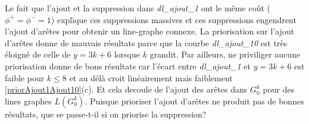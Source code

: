 \documentclass[onecolumn, 12pt]{book}
\begin{document}
Le fait que  l'ajout et la suppression dans {\em dl\_ajout\_1} ont le m\^eme co\^ut ($\phi^{+} = \phi^{-} = 1$) explique ces suppressions massives et ces suppressions engendrent l'ajout d'ar\^etes pour obtenir un line-graphe connexe.
\newline
La priorisation sur l'ajout d'ar\^etes donne de mauvais r\'esultats parce que la courbe {\em dl\_ajout\_10} est tr\`es \'eloign\'e de celle de $y = 3k+6$ lorsque $k$ grandit.
Par ailleurs, ne priviliger aucune priorisation donne de bons r\'esultats car l'\'ecart entre {\em dl\_ajout\_1} et $y=3k+6$ est  faible pour $k \le 8$ et au d\'el\`a croit lin\'eairement mais faiblement  \ref{priorAjout1Ajout10}(c). Et cela decoule de l'ajout des ar\^etes dans $G_0^k$ pour des lines graphes $L(G_0^k)$.  
\newline
Puisque prioriser l'ajout d'ar\^etes ne produit pas de bonnes r\'esultats, que se passe-t-il si on priorise la suppression?   


\end{document}
